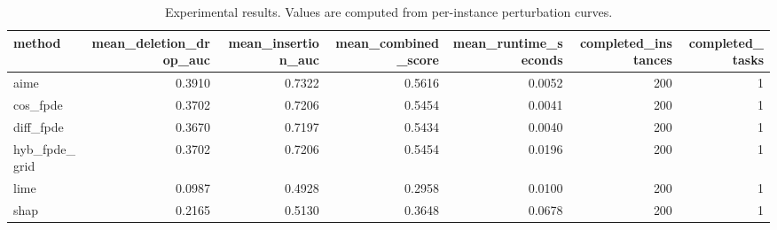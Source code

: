 \begin{table}[t]
\caption{Experimental results. Values are computed from per-instance perturbation curves.}
\label{tab:main_results_computed}
\centering
\begin{tabular}{lrrrrrr}
\toprule
method & mean\_deletion\_drop\_auc & mean\_insertion\_auc & mean\_combined\_score & mean\_runtime\_seconds & completed\_instances & completed\_tasks \\
\midrule
aime & 0.3910 & 0.7322 & 0.5616 & 0.0052 & 200 & 1 \\
cos\_fpde & 0.3702 & 0.7206 & 0.5454 & 0.0041 & 200 & 1 \\
diff\_fpde & 0.3670 & 0.7197 & 0.5434 & 0.0040 & 200 & 1 \\
hyb\_fpde\_grid & 0.3702 & 0.7206 & 0.5454 & 0.0196 & 200 & 1 \\
lime & 0.0987 & 0.4928 & 0.2958 & 0.0100 & 200 & 1 \\
shap & 0.2165 & 0.5130 & 0.3648 & 0.0678 & 200 & 1 \\
\bottomrule
\end{tabular}

\end{table}
